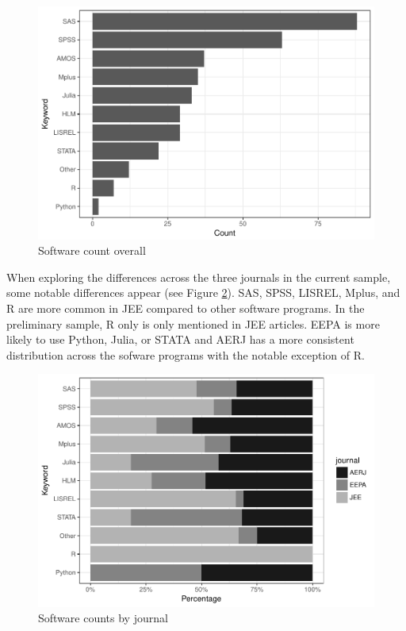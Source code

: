 \documentclass[english,man]{apa6}
\theoremstyle{definition}
\theoremstyle{definition}
\theoremstyle{definition}
\theoremstyle{remark}
\begin{document}
\begin{figure}
\centering
\includegraphics{jsm_draft_files/figure-latex/count-software-1.pdf}
\caption{\label{fig:count-software}Software count overall}
\end{figure}

When exploring the differences across the three journals in the current
sample, some notable differences appear (see Figure
\ref{fig:software-journal}). SAS, SPSS, LISREL, Mplus, and R are more
common in JEE compared to other software programs. In the preliminary
sample, R only is only mentioned in JEE articles. EEPA is more likely to
use Python, Julia, or STATA and AERJ has a more consistent distribution
across the sofware programs with the notable exception of R.

\begin{figure}
\centering
\includegraphics{jsm_draft_files/figure-latex/software-journal-1.pdf}
\caption{\label{fig:software-journal}Software counts by journal}
\end{figure}
\end{document}

